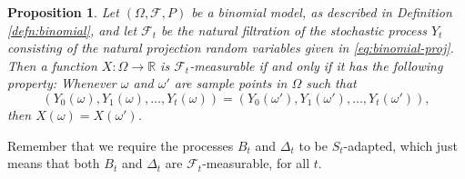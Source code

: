 \documentclass[reqno]{amsart}
\newtheorem{prop}[thm]{Proposition}
\theoremstyle{definition}
\numberwithin{equation}{section}
\begin{document}
\begin{prop}
Let $(\Omega, \mathcal{F},P)$ be a binomial model, as described in Definition \ref{defn:binomial}, and let $\mathcal{F}_t$ be the natural filtration of the stochastic process $Y_t$ consisting of the natural projection random variables given in \eqref{eq:binomial-proj}. Then a function $X: \Omega \to \mathbb{R}$ is $\mathcal{F}_t$-measurable if and only if it has the following property: Whenever $\omega$ and $\omega'$ are sample points in $\Omega$ such that
	\[
	(Y_0(\omega), Y_1(\omega), \ldots, Y_t(\omega)) = (Y_0(\omega'), Y_1(\omega'), \ldots, Y_t(\omega')),
	\] 
then $X(\omega) = X(\omega')$. \qedhere
\end{prop}	
	
Remember that we require the processes $B_t$ and $\Delta_t$ to be $S_t$-adapted, which just means that both $B_t$ and $\Delta_t$ are $\mathcal{F}_t$-measurable, for all $t$.
\end{document}
